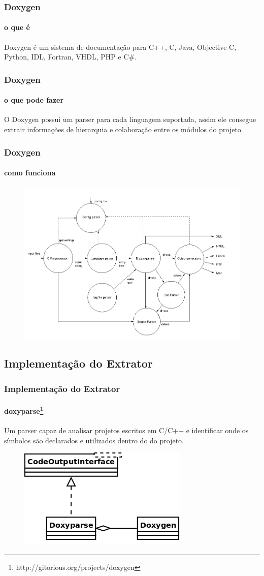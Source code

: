 \documentclass{beamer}
\begin{document}
\begin{frame}
\frametitle{Doxygen}
\framesubtitle{o que é}
 Doxygen é um sistema de documentação para C++, C, Java, Objective-C, Python,
 IDL, Fortran, VHDL, PHP e C\#.
\end{frame}

\begin{frame}
\frametitle{Doxygen}
\framesubtitle{o que pode fazer}
 O Doxygen possui um parser para cada linguagem suportada, assim ele consegue extrair
 informações de hierarquia e colaboração entre os módulos do projeto.
\end{frame}

\begin{frame}
\frametitle{Doxygen}
\framesubtitle{como funciona\cite{doxygenInternals}}
 \begin{figure}[h]
 \center
 \includegraphics[scale=0.25]{imagens/doxygen-internals-flow}
 \label{fig:doxygen-internals-flow}
 \end{figure}
\end{frame}

\subsection{Implementação do Extrator}

\begin{frame}
\frametitle{Implementação do Extrator}
\framesubtitle{doxyparse\footnote{http://gitorious.org/projects/doxygen}}
 Um parser capaz de analisar projetos escritos em C/C++ e identificar onde os
 símbolos são declarados e utilizados dentro do do projeto.
 \begin{figure}[h]
 \center
 \includegraphics[scale=0.3]{imagens/doxyparse-diagram}
 \label{doxyparse-diagram}
 \end{figure}
\end{frame}
\end{document}
